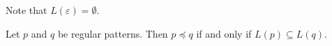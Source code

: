 Note that $L(\varepsilon) = \emptyset$.

\begin{lem}\label{regularPatternEquivalence}
  Let $p$ and $q$ be regular patterns.
  Then $p \preceq q$ if and only if $L(p) \subseteq L(q)$.
\end{lem}


